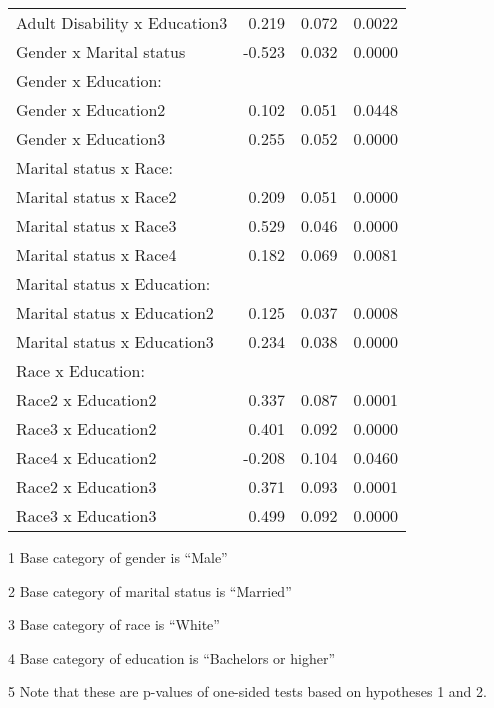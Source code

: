 \begin{table}[H]
\begin{threeparttable}
\begin{tabular}{lrcl}
  \hspace{5pt}   Adult Disability x Education3 		& 0.219		& 0.072 & 0.0022 \\ 
  Gender x Marital status 				& -0.523 	& 0.032 & 0.0000 \\ 
Gender x Education: & & & \\
  \hspace{5pt}   Gender x Education2 			& 0.102		& 0.051 & 0.0448 \\ 
  \hspace{5pt}   Gender x Education3 			& 0.255		& 0.052 & 0.0000 \\ 
Marital status x Race: & & & \\
  \hspace{5pt}   Marital status x Race2 		& 0.209		& 0.051 & 0.0000 \\ 
  \hspace{5pt}   Marital status x Race3 		& 0.529		& 0.046 & 0.0000 \\ 
  \hspace{5pt}   Marital status x Race4 		& 0.182		& 0.069 & 0.0081 \\ 
Marital status x Education: & & & \\
  \hspace{5pt}   Marital status x Education2 		& 0.125		& 0.037 & 0.0008 \\ 
  \hspace{5pt}   Marital status x Education3 		& 0.234		& 0.038 & 0.0000 \\ 
Race x Education: & & & \\
  \hspace{5pt}   Race2 x Education2 			& 0.337		& 0.087 & 0.0001 \\ 
  \hspace{5pt}   Race3 x Education2 			& 0.401		& 0.092 & 0.0000 \\ 
  \hspace{5pt}   Race4 x Education2 			& -0.208 	& 0.104 & 0.0460 \\ 
  \hspace{5pt}   Race2 x Education3 			& 0.371		& 0.093 & 0.0001 \\ 
  \hspace{5pt}   Race3 x Education3 			& 0.499		& 0.092 & 0.0000 \\ 
  \hline
\end{tabular}
\begin{tablenotes}\footnotesize
\item[1] Base category of gender is ``Male''
\item[2] Base category of marital status is ``Married''
\item[3] Base category of race is ``White''
\item[4] Base category of education is ``Bachelors or higher''
\item[5] Note that these are p-values of one-sided tests based on hypotheses 1 and 2. 
\end{tablenotes}
\end{threeparttable}
\label{tab:Table2Reg}
\end{table}

